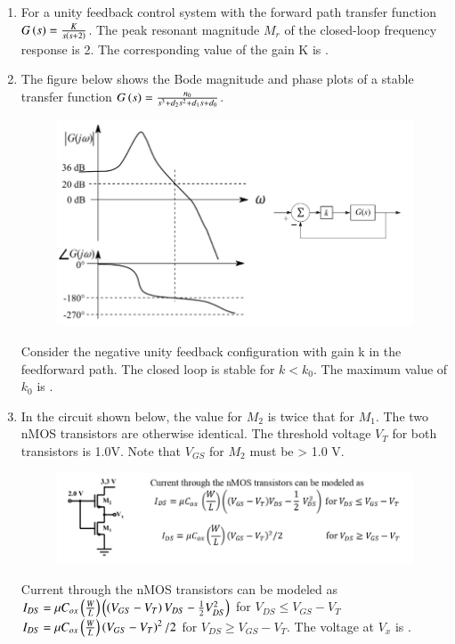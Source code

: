\documentclass[a4paper, 11pt]{article}
\begin{document}
\begin{enumerate}
    \hfill{}

    \item For a unity feedback control system with the forward path transfer function $G\left(s\right) = \frac{K}{s\left(s+2\right)}$. The peak resonant magnitude $M_r$ of the closed-loop frequency response is 2. The corresponding value of the gain K  is \underline{\hspace{2cm}}.
    
    \hfill{}

    \item The figure below shows the Bode magnitude and phase plots of a stable transfer function $G\left(s\right) = \frac{n_0}{s^3+d_2s^2+d_1s+d_0}$.
    \begin{figure}[H]
        \centering
        \includegraphics[width=\columnwidth]{figs/q42.png}
        \caption*{}
        \label{fig:q42}
    \end{figure}
    Consider the negative unity feedback configuration with gain k in the feedforward path. The closed loop is stable for $k < k_0$. The maximum value of $k_0$ is \underline{\hspace{2cm}}.
    
    \hfill{}

    \item In the circuit shown below, the  value for $M_2$ is twice that for $M_1$. The two nMOS transistors are otherwise identical. The threshold voltage $V_T$ for both transistors is 1.0V. Note that $V_{GS}$ for $M_2$ must be > 1.0 V.
    \begin{figure}[H]
        \centering
        \includegraphics[width=0.4\columnwidth]{figs/q43.png}
        \caption*{}
        \label{fig:q43}
    \end{figure}
    Current through the nMOS transistors can be modeled as
    $I_{DS} = \mu C_{ox}\left(\frac{W}{L}\right)\left(\left(V_{GS}-V_T\right)V_{DS} - \frac{1}{2}V_{DS}^2\right)$ for $V_{DS} \le V_{GS}-V_T$
    $I_{DS} = \mu C_{ox}\left(\frac{W}{L}\right)\left(V_{GS}-V_T\right)^2/2$ for $V_{DS} \ge V_{GS}-V_T$.
    The voltage  at $V_x$ is \underline{\hspace{2cm}}.


\end{enumerate}
\end{document}
